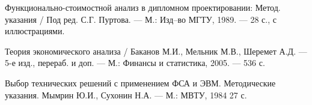 
 Функционально-стоимостной анализ в дипломном проектировании:
                    Метод. указания / Под ред. С.Г. Пуртова. ---
                    М.: Изд--во МГТУ, 1989. --- 28 с., с иллюстрациями.

 Теория экономического анализа / Баканов М.И., Мельник М.В.,
                    Шеремет А.Д. --- 5-е изд., перераб. и доп. --- М.:
                    Финансы и статистика, 2005. --- 536 с.

 Выбор технических решений с применением ФСА и ЭВМ.
                      Методические указания. Мымрин Ю.И., Сухонин Н.А. ---
                      М.: МВТУ, 1984 27 с.
